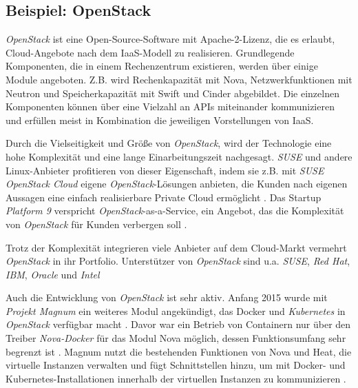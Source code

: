 \documentclass[../main.tex]{subfiles}
\begin{document}
    \subsection{Beispiel: OpenStack}
      \emph{OpenStack} ist eine Open-Source-Software mit Apache-2-Lizenz, die es erlaubt, Cloud-Angebote nach dem IaaS-Modell zu realisieren. Grundlegende Komponenten, die in einem Rechenzentrum existieren, werden über einige Module angeboten. Z.B. wird Rechenkapazität mit Nova, Netzwerkfunktionen mit Neutron und Speicherkapazität mit Swift und Cinder abgebildet. Die einzelnen Komponenten können über eine Vielzahl an APIs miteinander kommunizieren und erfüllen meist in Kombination die jeweiligen Vorstellungen von IaaS.

      Durch die Vielseitigkeit und Größe von \emph{OpenStack}, wird der Technologie eine hohe Komplexität und eine lange Einarbeitungszeit nachgesagt. \emph{SUSE} und andere Linux-Anbieter profitieren von dieser Eigenschaft, indem sie z.B. mit \emph{SUSE OpenStack Cloud} eigene \emph{OpenStack}-Lösungen anbieten, die Kunden nach eigenen Aussagen eine einfach realisierbare Private Cloud ermöglicht \cite{SusePrivateCloud}\cite[S.2+4]{golemOpenStack}.
      Das Startup \emph{Platform 9} verspricht \emph{OpenStack}-as-a-Service, ein Angebot, das die Komplexität von \emph{OpenStack} für Kunden verbergen soll \cite{platform9}.

      Trotz der Komplexität integrieren viele Anbieter auf dem Cloud-Markt vermehrt \emph{OpenStack} in ihr Portfolio. Unterstützer von \emph{OpenStack} sind u.a. \emph{SUSE}, \emph{Red Hat}, \emph{IBM}, \emph{Oracle} und \emph{Intel} \cite{heiseOpenStack}

      Auch die Entwicklung von \emph{OpenStack} ist sehr aktiv. Anfang 2015 wurde mit \emph{Projekt Magnum} ein weiteres Modul angekündigt, das Docker und \emph{Kubernetes} in \emph{OpenStack} verfügbar macht \cite{openStackMagnum}. Davor war ein Betrieb von Containern nur über den Treiber \emph{Nova-Docker} für das Modul Nova möglich, dessen Funktionsumfang sehr begrenzt ist \cite{heiseOpenStackContainer}\cite{openStackDocker}.
      Magnum nutzt die bestehenden Funktionen von Nova und Heat, die virtuelle Instanzen verwalten und fügt Schnittstellen hinzu, um mit Docker- und Kubernetes-Installationen innerhalb der virtuellen Instanzen zu kommunizieren \cite{openStackMagnum}.
\end{document}
